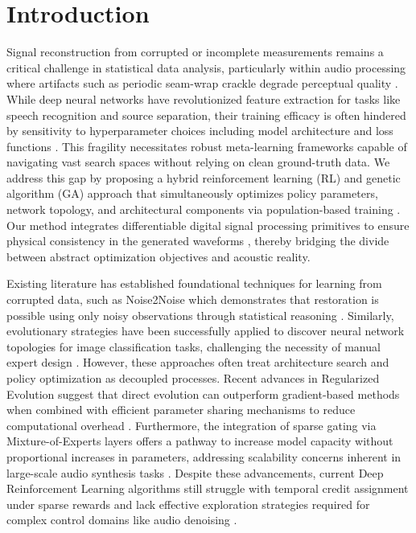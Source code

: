 \section{Introduction}

Signal reconstruction from corrupted or incomplete measurements remains a critical challenge in statistical data analysis, particularly within audio processing where artifacts such as periodic seam-wrap crackle degrade perceptual quality \cite{stoller2018}. While deep neural networks have revolutionized feature extraction for tasks like speech recognition and source separation, their training efficacy is often hindered by sensitivity to hyperparameter choices including model architecture and loss functions \cite{jaderberg2017}. This fragility necessitates robust meta-learning frameworks capable of navigating vast search spaces without relying on clean ground-truth data. We address this gap by proposing a hybrid reinforcement learning (RL) and genetic algorithm (GA) approach that simultaneously optimizes policy parameters, network topology, and architectural components via population-based training \cite{jaderberg2017}. Our method integrates differentiable digital signal processing primitives to ensure physical consistency in the generated waveforms \cite{engel2020}, thereby bridging the divide between abstract optimization objectives and acoustic reality.

Existing literature has established foundational techniques for learning from corrupted data, such as Noise2Noise which demonstrates that restoration is possible using only noisy observations through statistical reasoning \cite{lehtinen2018}. Similarly, evolutionary strategies have been successfully applied to discover neural network topologies for image classification tasks, challenging the necessity of manual expert design \cite{real2019}. However, these approaches often treat architecture search and policy optimization as decoupled processes. Recent advances in Regularized Evolution suggest that direct evolution can outperform gradient-based methods when combined with efficient parameter sharing mechanisms to reduce computational overhead \cite{pham2018;elsken2019}. Furthermore, the integration of sparse gating via Mixture-of-Experts layers offers a pathway to increase model capacity without proportional increases in parameters, addressing scalability concerns inherent in large-scale audio synthesis tasks \cite{shazeer2017}. Despite these advancements, current Deep Reinforcement Learning algorithms still struggle with temporal credit assignment under sparse rewards and lack effective exploration strategies required for complex control domains like audio denoising \cite{khadka2018;schulman2017}.

